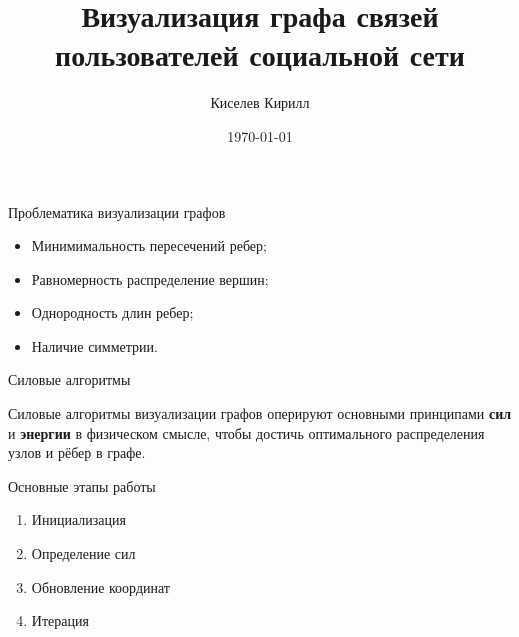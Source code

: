 \documentclass{beamer}
\title{Визуализация графа связей пользователей социальной сети}
\date{\today}
\author{Киселев Кирилл}
\institute{МГТУ им. Н.Э. Баумана}
\begin{document}
\maketitle

\begin{frame}{Проблематика визуализации графов}

	\begin{itemize}
		\item Минимимальность пересечений ребер;
		\item Равномерность распределение вершин;
		\item Однородность длин ребер;
		\item Наличие симметрии.
	\end{itemize}


\end{frame}

\begin{frame}{Силовые алгоритмы}

	\alert{Силовые алгоритмы} визуализации графов оперируют основными принципами \textbf{сил} и \textbf{энергии} в физическом смысле, чтобы достичь оптимального распределения узлов и рёбер в графе.

  \begin{alertblock}{Основные этапы работы}
    \begin{enumerate}
		\item Инициализация
		\item Определение сил
		\item Обновление координат
		\item Итерация
	\end{enumerate}
  \end{alertblock}
	


\end{frame}
\end{document}

